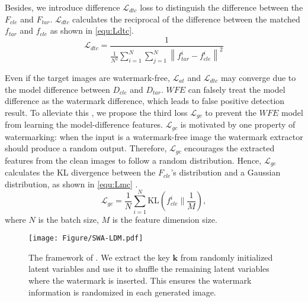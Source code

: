 Besides, we introduce difference \(\mathcal{L}_{dtc}\) loss to distinguish the difference between the \(F_{cle}\) and \(F_{tar}\).   \(\mathcal{L}_{dtc}\)  calculates the reciprocal of the difference between the matched \(f_{tar}\) and \(f_{cle}\) as shown in \cref{equ:Ldtc}. 
\begin{equation}
\mathcal{L}_{dtc} =\frac{1}{\frac{1}{N^2} \sum_{i=1}^{N} \sum_{j=1}^{N} \left\|f_{{tar}}^i-f_{{cle}}^i\right\|^2} 
\label{equ:Ldtc}
\end{equation}

Even if the target images are watermark-free,  \(\mathcal{L}_{at}\) and \(\mathcal{L}_{dtc}\) may converge due to the model difference between \(D_{cle}\) and \(D_{tar}\). $WFE$ can falsely treat the model difference as the watermark difference, which leads to false positive detection result. To alleviate this , we propose the third loss \(\mathcal{L}_{gc}\) to prevent the \(WFE\) model from learning the model-difference features. \(\mathcal{L}_{gc}\) is motivated by one property of watermarking: when the input is a watermark-free image the watermark extractor should produce a random output. Therefore, \(\mathcal{L}_{gc}\) encourages the extracted features from the clean images to follow a random distribution. Hence, \(\mathcal{L}_{gc}\) calculates the KL divergence \cite{KLDivergence} between the \(F_{cle}\)'s distribution and a Gaussian distribution, as shown in \cref{equ:Lmc} .
\begin{equation}
\mathcal{L}_{gc} =\frac{1}{N} \sum_{i=1}^{N} \text{KL}\left(f_{{cle}}^i \parallel \frac{1}{M} \right), \label{equ:Lmc}
\end{equation}
where \( N \) is the batch size, \( M \) is the feature dimension size.  

\begin{figure*}[t]
  \centering
  \texttt{[image: Figure/SWA-LDM.pdf]}
  \vspace{-0.3cm}
  \caption{The framework of \tool. 
  We extract the key $\mathbf{k}$ from randomly initialized latent variables and use it to shuffle the remaining latent variables where the watermark is inserted. This ensures the watermark information is randomized in each generated image. 
  }
  \label{fig:swa-ldm}
  \vspace{-0.5cm}
\end{figure*} 


\section{\tool{}}

